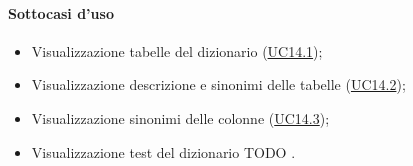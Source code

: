 \paragraph*{Sottocasi d'uso}
\begin{itemize}
  \item Visualizzazione tabelle del dizionario (\hyperref[UC14point1]{UC14.1});
  \item Visualizzazione descrizione e sinonimi delle tabelle (\hyperref[UC14point2]{UC14.2});
  \item Visualizzazione sinonimi delle colonne (\hyperref[UC14point3]{UC14.3});
  \item Visualizzazione test del dizionario TODO .  
\end{itemize}